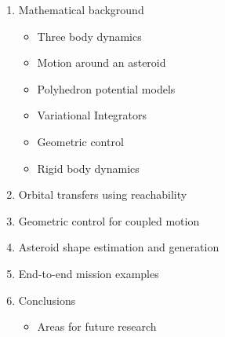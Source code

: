 \begin{enumerate}
    \item Mathematical background
        \begin{itemize}
            \item Three body dynamics
            \item Motion around an asteroid
            \item Polyhedron potential models
            \item Variational Integrators
            \item Geometric control
            \item Rigid body dynamics
        \end{itemize}
    \item Orbital transfers using reachability
    \item Geometric control for coupled motion
    \item Asteroid shape estimation and generation
    \item End-to-end mission examples
    \item Conclusions
        \begin{itemize}
            \item Areas for future research
        \end{itemize}
\end{enumerate}

